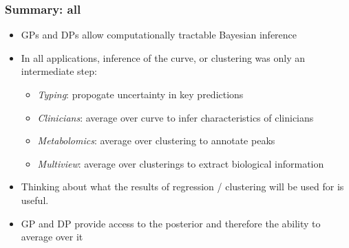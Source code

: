 \begin{frame}
	\frametitle{Summary: all}
	\begin{itemize}
		\item \ac{GP}s and \ac{DP}s allow computationally tractable Bayesian inference
		\item In all applications, inference of the curve, or clustering was only an intermediate step:
		\begin{itemize}
			\item \emph{Typing}: propogate uncertainty in key predictions
			\item \emph{Clinicians}: average over curve to infer characteristics of clinicians
			\item \emph{Metabolomics}: average over clustering to annotate peaks
			\item \emph{Multiview}: average over clusterings to extract biological information
		\end{itemize}
		\item Thinking about what the results of regression / clustering will be used for is useful.
		\item \ac{GP} and \ac{DP} provide access to the posterior and therefore the ability to average over it
	\end{itemize}
\end{frame}